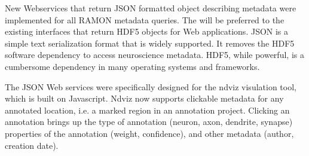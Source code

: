 \documentclass[simplex.tex]{subfiles}
\begin{document}
New Webservices that return JSON formatted object describing metadata
were implemented for all RAMON metadata queries.  The will be preferred
to the existing interfaces that return HDF5 objects for Web
applications.  JSON is a simple text serialization format that is widely
supported.  It removes the HDF5 software dependency to access
neuroscience metadata. HDF5, while powerful, is a cumbersome dependency
in many operating systems and frameworks.


The JSON Web services were specifically designed for the ndviz
visulation tool, which is built on Javascript.  Ndviz now supports
clickable metadata for any annotated location, i.e. a marked region in
an annotation project.  Clicking an annotation brings up the type of
annotation (neuron, axon, dendrite, synapse) properties of the
annotation (weight, confidence), and other metadata (author, creation
date).
\end{document}
